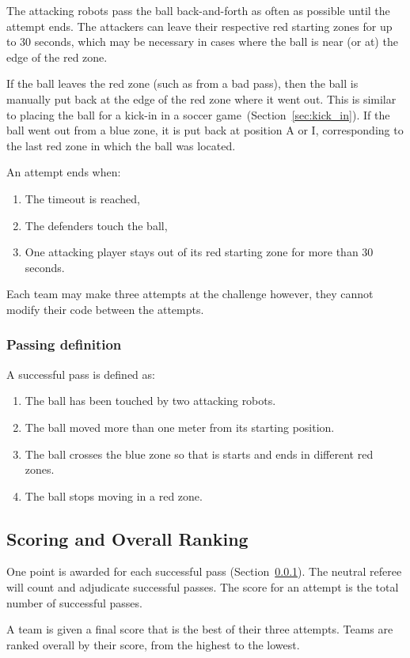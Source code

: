 The attacking robots pass the ball back-and-forth as often as possible until the attempt ends. The attackers can leave their respective red starting zones for up to 30 seconds, which may be necessary in cases where the ball is near (or at) the edge of the red zone.

If the ball leaves the red zone (such as from a bad pass), then the ball is manually put back at the edge of the red zone where it went out. This is similar to placing the ball for a kick-in in a soccer game~(\cf Section~\ref{sec:kick_in}).  If the ball went out from a blue zone, it is put back at position A or I, corresponding to the last red zone in which the ball was located.
    
An attempt ends when: 
\begin{enumerate}
    \item The timeout is reached,
    \item The defenders touch the ball,
    \item One attacking player stays out of its red starting zone for more than 30 seconds.
\end{enumerate}

Each team may make three attempts at the challenge however, they cannot modify their code between the attempts.

\subsubsection{Passing definition}
\label{sec:pass-definition}
A successful pass is defined as:
\begin{enumerate}
    \item The ball has been touched by two attacking robots.
    \item The ball moved more than one meter from its starting position.
    \item The ball crosses the blue zone so that is starts and ends in different red zones.
    \item The ball stops moving in a red zone.
\end{enumerate}

\subsection{Scoring and Overall Ranking}
One point is awarded for each successful pass (\cf Section~\ref{sec:pass-definition}). The neutral referee will count and adjudicate successful passes. The score for an attempt is the total number of successful passes.

A team is given a final score that is the best of their three attempts. Teams are ranked overall by their score, from the highest to the lowest. 
